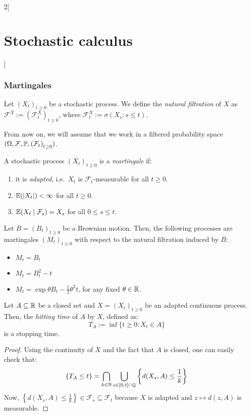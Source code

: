 \documentclass[../../../main_math.tex]{subfiles}
\begin{document}
\begin{multicols}{2}[\section{Stochastic calculus}]
  \subsubsection{Martingales}
  \begin{definition}
    Let ${(X_t)}_{t\geq 0}$ be a stochastic process. We define the \emph{natural filtration} of $X$ as $\mathcal{F}^X:={(\mathcal{F}_t^X)}_{t\geq 0}$, where $\mathcal{F}_t^X:=\sigma(X_s:s\leq t)$.
  \end{definition}
  From now on, we will assume that we work in a filtered probability space $(\Omega,\mathcal{F},\mathbb{P},{(\mathcal{F}_t)}_{t\geq 0})$.
  \begin{definition}[Martingale]
    A stochastic process ${(X_t)}_{t\geq 0}$ is a \emph{martingale} if:
    \begin{enumerate}
      \item it is \emph{adapted}, i.e.\ $X_t$ is $\mathcal{F}_t$-measurable for all $t\geq 0$.
      \item $\mathbb{E}(\abs{X_t})<\infty$ for all $t\geq 0$.
      \item $\mathbb{E}(X_t\mid \mathcal{F}_s)=X_s$ for all $0\leq s\leq t$.
    \end{enumerate}
  \end{definition}
  \begin{proposition}
    Let $B={(B_t)}_{t\geq 0}$ be a Brownian motion. Then, the following processes are martingales ${(M_t)}_{t\geq 0}$ with respect to the natural filtration induced by $B$:
    \begin{itemize}
      \item $M_t=B_t$
      \item $M_t=B_t^2-t$
      \item $M_t=\exp{\theta B_t-\frac{1}{2}\theta^2t}$, for any fixed $\theta\in\mathbb{R}$.
    \end{itemize}
  \end{proposition}
  \begin{proposition}
    Let $A\subseteq \mathbb{R}$ be a closed set and $X={(X_t)}_{t\geq 0}$ be an adapted continuous process. Then, the \emph{hitting time} of $A$ by $X$, defined as:
    $$
      T_A:=\inf\{t\geq 0:X_t\in A\}
    $$
    is a stopping time.
  \end{proposition}
  \begin{proof}
    Using the continuity of $X$ and the fact that $A$ is closed, one can easily check that:
    $$
      \{T_A \leq t\}=\bigcap_{k\in\mathbb{N}}\bigcup_{s\in[0,t]\cap\mathbb{Q}}\left\{d(X_s,A)\leq\frac{1}{k}\right\}
    $$
    Now, $\left\{d(X_s,A)\leq\frac{1}{k}\right\}\in \mathcal{F}_s\subseteq \mathcal{F}_t$ because $X$ is adapted and $z\mapsto d(z,A)$ is measurable.

\end{proof}
\end{multicols}
\end{document}
